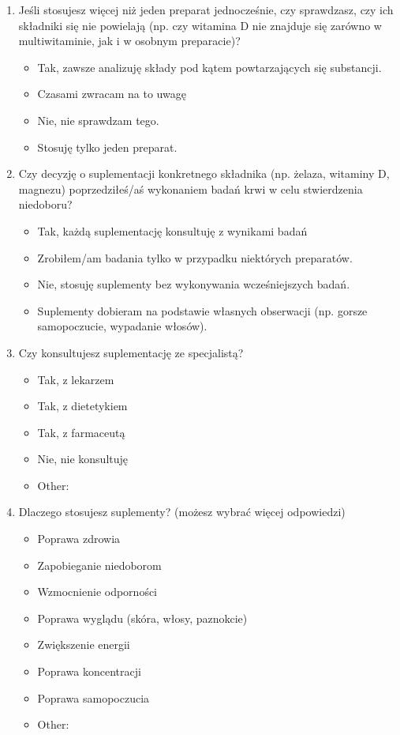 \begin{appendices}
\begin{enumerate}
    \item Jeśli stosujesz więcej niż jeden preparat jednocześnie, czy sprawdzasz, czy ich składniki się nie powielają (np. czy witamina D nie znajduje się zarówno w multiwitaminie, jak i w osobnym preparacie)?
    \begin{itemize}
        \item Tak, zawsze analizuję składy pod kątem powtarzających się substancji.
        \item Czasami zwracam na to uwagę
        \item Nie, nie sprawdzam tego.
        \item Stosuję tylko jeden preparat.
    \end{itemize}

    \item Czy decyzję o suplementacji konkretnego składnika (np. żelaza, witaminy D, magnezu) poprzedziłeś/aś wykonaniem badań krwi w celu stwierdzenia niedoboru?
    \begin{itemize}
        \item Tak, każdą suplementację konsultuję z wynikami badań
        \item Zrobiłem/am badania tylko w przypadku niektórych preparatów.
        \item Nie, stosuję suplementy bez wykonywania wcześniejszych badań.
        \item Suplementy dobieram na podstawie własnych obserwacji (np. gorsze samopoczucie, wypadanie włosów).
    \end{itemize}

    \item Czy konsultujesz suplementację ze specjalistą?
    \begin{itemize}
        \item Tak, z lekarzem
        \item Tak, z dietetykiem
        \item Tak, z farmaceutą
        \item Nie, nie konsultuję
        \item Other:
    \end{itemize}

    \item Dlaczego stosujesz suplementy? (możesz wybrać więcej odpowiedzi)
    \begin{itemize}
        \item Poprawa zdrowia
        \item Zapobieganie niedoborom
        \item Wzmocnienie odporności
        \item Poprawa wyglądu (skóra, włosy, paznokcie)
        \item Zwiększenie energii
        \item Poprawa koncentracji
        \item Poprawa samopoczucia
        \item Other:
    \end{itemize}


\end{enumerate}
\end{appendices}
